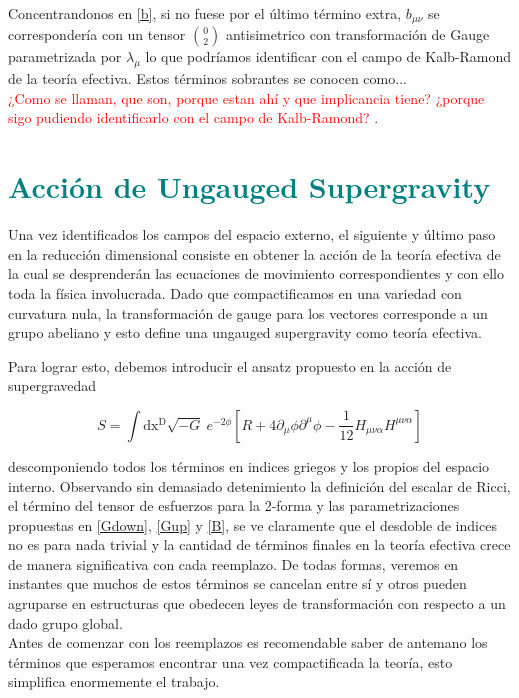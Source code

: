 \documentclass{article}
\numberwithin{equation}{section}
\begin{document}
Concentrandonos en \ref{b}, si no fuese por el último término extra, $ b_{\mu \nu} $ se correspondería con un tensor $ \binom{0}{2} $ antisimetrico con transformación de Gauge parametrizada por $ \lambda_{\mu} $ lo que podríamos identificar con el campo de Kalb-Ramond de la teoría efectiva. Estos términos sobrantes se conocen como...\\

\textcolor{red}{¿Como se llaman, que son, porque estan ahí y que implicancia tiene? ¿porque sigo pudiendo identificarlo con el campo de Kalb-Ramond? }.
\section{\textcolor{teal}{Acción de Ungauged Supergravity}}


Una vez identificados los campos del espacio externo, el siguiente y último paso en la reducción dimensional consiste en obtener la acción de la teoría efectiva de la cual se desprenderán las ecuaciones de movimiento correspondientes y con ello toda la física involucrada. Dado que compactificamos en una variedad con curvatura nula, la transformación de gauge para los vectores corresponde a un grupo abeliano y esto define una ungauged supergravity como teoría efectiva. 

Para lograr esto, debemos introducir el ansatz propuesto en la acción de supergravedad

\begin{equation}\label{S}
S=\int\mathrm{dx^D} \sqrt{-G} \ e^{-2\phi}\left[R + 4 \partial_{\mu}\phi\partial^{\mu} \phi - \frac{1}{12} H_{\mu \nu \alpha}H^{\mu \nu \alpha}\right]  
\end{equation}

descomponiendo todos los términos en indices griegos y los propios del espacio interno. Observando sin demasiado detenimiento la definición del escalar de Ricci, el término del tensor de esfuerzos para la 2-forma y las parametrizaciones propuestas en \ref{Gdown}, \ref{Gup} y \ref{B}, se ve claramente que el desdoble de indices no es para nada trivial y la cantidad de términos finales en la teoría efectiva crece de manera significativa con cada reemplazo. De todas formas, veremos en instantes que muchos de estos términos se cancelan entre sí y otros pueden agruparse en estructuras que obedecen leyes de transformación con respecto a un dado grupo global.\\ 
	
Antes de comenzar con los reemplazos es recomendable saber de antemano los términos que esperamos encontrar una vez compactificada la teoría, esto simplifica enormemente el trabajo.\\
\end{document}
